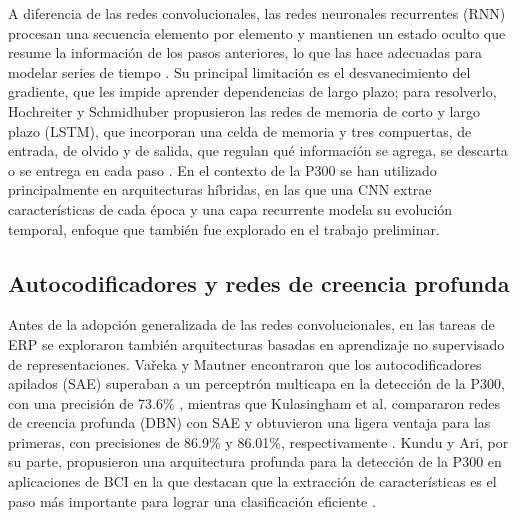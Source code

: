 A diferencia de las redes convolucionales, las redes neuronales recurrentes (RNN) procesan una
secuencia elemento por elemento y mantienen un estado oculto que resume la información de los
pasos anteriores, lo que las hace adecuadas para modelar series de tiempo \cite{goodfellow2016}.
Su principal limitación es el desvanecimiento del gradiente, que les impide aprender dependencias
de largo plazo; para resolverlo, Hochreiter y Schmidhuber propusieron las redes de memoria de
corto y largo plazo (LSTM), que incorporan una celda de memoria y tres compuertas, de entrada, de
olvido y de salida, que regulan qué información se agrega, se descarta o se entrega en cada paso
\cite{hochreiter1997}. En el contexto de la P300 se han utilizado principalmente en arquitecturas
híbridas, en las que una CNN extrae características de cada época y una capa recurrente modela su
evolución temporal, enfoque que también fue explorado en el trabajo preliminar.

\subsection{Autocodificadores y redes de creencia profunda}

Antes de la adopción generalizada de las redes convolucionales, en las tareas de ERP se exploraron
también arquitecturas basadas en aprendizaje no supervisado de representaciones. Vařeka y Mautner
encontraron que los autocodificadores apilados (SAE) superaban a un perceptrón multicapa en la
detección de la P300, con una precisión de 73.6\% \cite{vareka2017}, mientras que Kulasingham et
al. compararon redes de creencia profunda (DBN) con SAE y obtuvieron una ligera ventaja para las
primeras, con precisiones de 86.9\% y 86.01\%, respectivamente \cite{kulasingham2016}. Kundu y Ari,
por su parte, propusieron una arquitectura profunda para la detección de la P300 en aplicaciones de
BCI en la que destacan que la extracción de características es el paso más importante para lograr
una clasificación eficiente \cite{kundu2020}.

